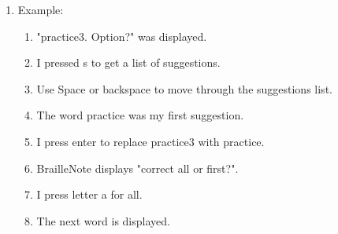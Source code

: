 \documentclass[10pt,letterpaper,twoside]{report}
\begin{document}
{\begin{enumerate}
\begin{enumerate}
\begin{itemize}
			            \item Add word to the dictionary 
			            \item Correct the word 
			            \item Look up the word 
			            \item Suggestions 
		            \end{itemize}
		      \item An example of an error in my document is given here. Explore using the spelling checker in your own document. Use all options as appropriate.
	      \end{enumerate}
	\item Example:
	      \begin{enumerate}
		      \item "practice3. Option?" was displayed.
		      \item I pressed s to get a list of suggestions.
		      \item Use Space or backspace to move through the suggestions list.
		      \item The word practice was my first suggestion.
		      \item I press enter to replace practice3 with practice.
		      \item BrailleNote displays "correct all or first?".
		      \item I press letter a for all.
		      \item The next word is displayed.
	      \end{enumerate}
\end{enumerate}

}
\end{document}
